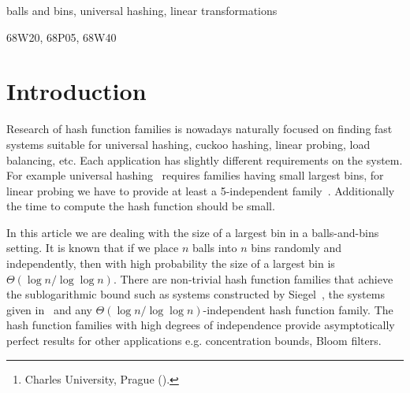 \documentclass[unicode,review]{siamart1116}
\title{\TheTitle}
\author{
  Martin Babka\thanks{Charles University, Prague (\email{babkys@gmail.com}).}
}
\newcommand{\vecspace}[2]{\mathbb{Z}_{#1}^{#2}}
\newcommand{\binvecspace}[1]{\vecspace{2}{#1}}
\numberwithin{theorem}{section}
\begin{document}
\maketitle

\begin{abstract}
We study the placement of $n$ balls into $n$ bins where balls and bins are represented as two vector spaces over $\binvecspace{}$. The placements is done according to a linear transformation between the two vector spaces.
We analyze the expected size of the largest bin. The only currently known upper bound is $O(\log n \log \log n)$ by Alon et al. and holds for placing $n \log n$ balls into $n$ bins.
We show that this bound can be improved to $O(\log n)$ in the case when $n$ balls are placed into $n$ bins.
We use the same basic technique as Alon et al. but give a tighter analysis for the mentioned case.
\end{abstract}

\begin{keywords}
balls and bins, universal hashing, linear transformations
\end{keywords}

\begin{AMS}
  68W20, %
  68P05, %
  68W40  %
\end{AMS}

\section{Introduction}

Research of hash function families is nowadays naturally focused on finding fast systems suitable for universal hashing, cuckoo hashing, linear probing, load balancing, etc.
Each application has slightly different requirements on the system.
For example universal hashing~\cite{cw} requires families having small largest bins, for linear probing we have to provide at least a 5-independent family~\cite{linear-probing}.
Additionally the time to compute the hash function should be small.

In this article we are dealing with the size of a largest bin in a balls-and-bins setting.
It is known that if we place $n$ balls into $n$ bins randomly and independently, then with high probability the size of a largest bin is $\Theta(\log n/\log \log n)$.
There are non-trivial hash function families that achieve the sublogarithmic bound such as systems constructed by Siegel~\cite{siegel}, the systems given in~\cite{celisetal} and any $\Theta(\log n/\log \log n)$-independent hash function family. 
The hash function families with high degrees of independence provide asymptotically perfect results for other applications e.g. concentration bounds, Bloom filters.
\end{document}
